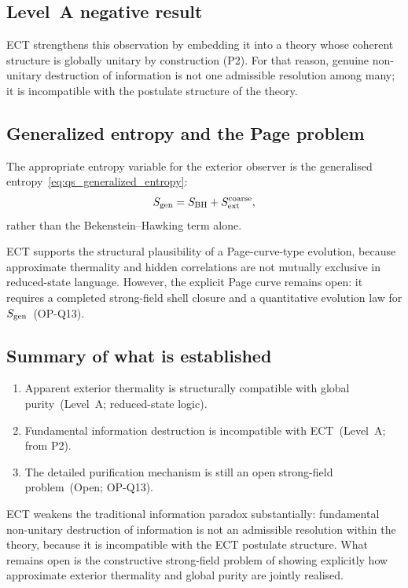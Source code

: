 \subsection*{Level~A negative result}

ECT strengthens this observation by embedding it into a theory whose
coherent structure is globally unitary by construction (P2).
For that reason, genuine non-unitary destruction of information is not
one admissible resolution among many; it is incompatible with the
postulate structure of the theory.

\subsection*{Generalized entropy and the Page problem}

The appropriate entropy variable for the exterior observer is the
generalised entropy~\eqref{eq:qs_generalized_entropy}:
\[
  S_{\rm gen}
  = S_{\rm BH} + S_{\rm ext}^{\rm coarse},
\]
rather than the Bekenstein--Hawking term alone.

ECT supports the structural plausibility of a Page-curve-type evolution,
because approximate thermality and hidden correlations are not mutually
exclusive in reduced-state language.
However, the explicit Page curve remains open: it requires a completed
strong-field shell closure and a quantitative evolution law for
$S_{\rm gen}$~(OP-Q13).

\subsection*{Summary of what is established}

\begin{enumerate}[label=(\roman*)]
  \item Apparent exterior thermality is structurally compatible with
    global purity~(Level~A; reduced-state logic).
  \item Fundamental information destruction is incompatible with
    ECT~(Level~A; from P2).
  \item The detailed purification mechanism is still an open strong-field
    problem~(Open; OP-Q13).
\end{enumerate}

ECT weakens the traditional information paradox substantially:
fundamental non-unitary destruction of information is not an admissible
resolution within the theory, because it is incompatible with the ECT
postulate structure.
What remains open is the constructive strong-field problem of showing
explicitly how approximate exterior thermality and global purity are
jointly realised.
